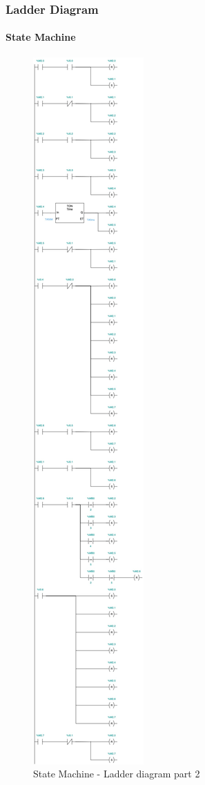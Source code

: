 \documentclass[12pt]{beamer}
\begin{document}
\begin{frame}
\frametitle{Ladder Diagram}
\framesubtitle{State Machine}
\begin{figure}
    \centering
    \includegraphics[trim={0 87cm 0 11cm}, clip, scale=.5]{img/Ladder_diagram_2.jpg}
    \caption{State Machine - Ladder diagram part 2}
    \label{fig:ladder22}
\end{figure}
\end{frame}
\end{document}
